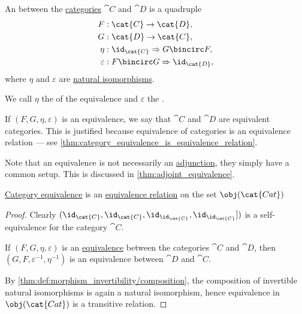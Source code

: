 \begin{definition}\label{def:category_equivalence}
  An  between the \hyperref[def:category]{categories} \( \cat{C} \) and \( \cat{D} \) is a quadruple
  \begin{equation}\label{eq:def:category_equivalence/signature}
    \begin{aligned}
                F &: \cat{C} \to \cat{D}, \\
                G &: \cat{D} \to \cat{C}, \\
             \eta &: \id_{\cat{C}} \Rightarrow G \bincirc F, \\
      \varepsilon &: F \bincirc G \Rightarrow \id_{\cat{D}},
    \end{aligned}
  \end{equation}
  where \( \eta \) and \( \varepsilon \) are \hyperref[thm:natural_isomorphism]{natural isomorphisms}.

  We call \( \eta \) the  of the equivalence and \( \varepsilon \) the .

  If \( (F, G, \eta, \varepsilon) \) is an equivalence, we say that \( \cat{C} \) and \( \cat{D} \) are equivalent categories. This is justified because equivalence of categories is an equivalence relation --- see \cref{thm:category_equivalence_is_equivalence_relation}.

  Note that an equivalence is not necessarily an \hyperref[def:category_adjunction]{adjunction}, they simply have a common setup. This is discussed in \cref{thm:adjoint_equivalence}.
\end{definition}

\begin{proposition}\label{thm:category_equivalence_is_equivalence_relation}
  \hyperref[def:category_equivalence]{Category equivalence} is an \hyperref[def:equivalence_relation]{equivalence relation} on the set \( \obj(\cat{Cat}) \)
\end{proposition}
\begin{proof}
   Clearly \( (\id_{\cat{C}}, \id_{\cat{C}}, \id_{\id_{\cat{C}}}, \id_{\id_{\cat{C}}}]) \) is a self-equivalence for the category \( \cat{C} \).

   If \( (F, G, \eta, \varepsilon) \) is an \hyperref[def:category_equivalence]{equivalence} between the categories \( \cat{C} \) and \( \cat{D} \), then \( (G, F, \varepsilon^{-1}, \eta^{-1}) \) is an equivalence between \( \cat{D} \) and \( \cat{C} \).

   By \cref{thm:def:morphism_invertibility/composition}, the composition of invertible natural isomorphisms is again a natural isomorphism, hence equivalence in \( \obj(\cat{Cat}) \) is a transitive relation.
\end{proof}

